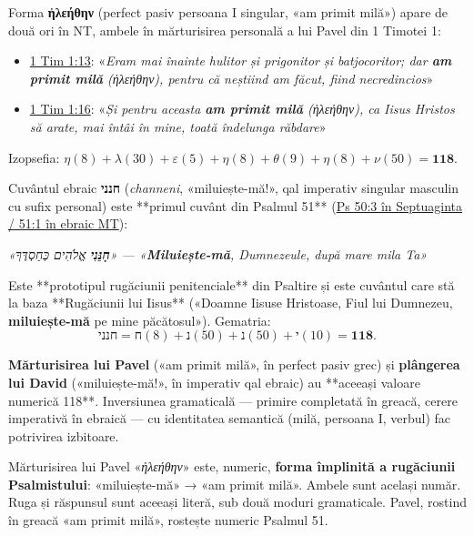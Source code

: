 \documentclass[12pt,a4paper,twoside,openany]{book}
\begin{document}
Forma \textbf{ἠλεήθην} (perfect pasiv persoana I singular, «am primit milă») apare de două ori în NT, ambele în mărturisirea personală a lui Pavel din 1 Timotei 1:

\begin{itemize}
  \item \href{https://bibliaortodoxa.ro/carte.php?id=81\&cap=1\#13}{1 Tim 1:13}: «\textit{Eram mai înainte hulitor și prigonitor și batjocoritor; dar \textbf{am primit milă} (ἠλεήθην), pentru că neștiind am făcut, fiind necredincios}»
  \item \href{https://bibliaortodoxa.ro/carte.php?id=81\&cap=1\#16}{1 Tim 1:16}: «\textit{Și pentru aceasta \textbf{am primit milă} (ἠλεήθην), ca Iisus Hristos să arate, mai întâi în mine, toată îndelunga răbdare}»
\end{itemize}

Izopsefia: $\eta(8) + \lambda(30) + \varepsilon(5) + \eta(8) + \theta(9) + \eta(8) + \nu(50) = \mathbf{118}$.

Cuvântul ebraic \textbf{חנני} (\textit{channeni}, «miluiește-mă!», qal imperativ singular masculin cu sufix personal) este **primul cuvânt din Psalmul 51** (\href{https://bibliaortodoxa.ro/carte.php?id=65\&cap=50\#3}{Ps 50:3 în Septuaginta / 51:1 în ebraic MT}):

\begin{biblequote}
\textit{«\textbf{חָנֵּנִי} אֱלֹהִים כְּחַסְדֶּךָ» — «\textbf{Miluiește-mă}, Dumnezeule, după mare mila Ta»}
\end{biblequote}

Este **prototipul rugăciunii penitenciale** din Psaltire și este cuvântul care stă la baza **Rugăciunii lui Iisus** («Doamne Iisuse Hristoase, Fiul lui Dumnezeu, \textbf{miluiește-mă} pe mine păcătosul»). Gematria:
\[
\text{חנני} = \text{ח}(8) + \text{נ}(50) + \text{נ}(50) + \text{י}(10) = \mathbf{118}.
\]

\textbf{Mărturisirea lui Pavel} («am primit milă», în perfect pasiv grec) și \textbf{plângerea lui David} («miluiește-mă!», în imperativ qal ebraic) au **aceeași valoare numerică 118**. Inversiunea gramaticală — primire completată în greacă, cerere imperativă în ebraică — cu identitatea semantică (milă, persoana I, verbul) fac potrivirea izbitoare.

Mărturisirea lui Pavel «\textit{ἠλεήθην}» este, numeric, \textbf{forma împlinită a rugăciunii Psalmistului}: «miluiește-mă» → «am primit milă». Ambele sunt același număr. Ruga și răspunsul sunt aceeași literă, sub două moduri gramaticale. Pavel, rostind în greacă «am primit milă», rostește numeric Psalmul 51.
\end{document}
